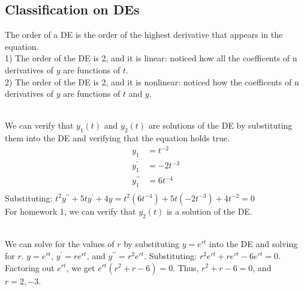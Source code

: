 \documentclass{article}
\begin{document}
\subsection{Classification on DEs}
The order of a DE is the order of the highest derivative that appears in the equation.
\sol \\ 
1) The order of the DE is 2, and it is linear: noticed how all the coefficents of n derivatives of $y$ are functions of $t$. \\
2) The order of the DE is 2, and it is nonlinear: noticed how the coefficents of n derivatives of $y$ are functions of $t$ and $y$.

\sol \\
We can verify that $y_1(t)$ and $y_2(t)$ are solutions of the DE by substituting them into the DE and verifying that the equation holds true. \\
\begin{align*}
  y_1 &= t^{-2} \\
  y_1^{\prime} &= -2t^{-3} \\
  y_1^{\prime \prime} &= 6t^{-4} \\
\end{align*}
Substituting: $t^2 y^{\prime \prime}+5 t y^{\prime}+4 y  = t^2(6t^{-4})+5t(-2t^{-3})+4t^{-2} = 0$ \\
For homework 1, we can verify that $y_2(t)$ is a solution of the DE.

\sol \\
We can solve for the values of $r$ by substituting $y=e^{rt}$ into the DE and solving for $r$.
$y=e^{rt}$, $y^{\prime}=re^{rt}$, and $y^{\prime \prime}=r^2e^{rt}$. Substituting: $r^2e^{rt}+re^{rt}-6e^{rt}=0$.
Factoring out $e^{rt}$, we get $e^{rt}(r^2+r-6)=0$. Thus, $r^2+r-6=0$, and $\boxed{r=2, -3}$.
\end{document}
